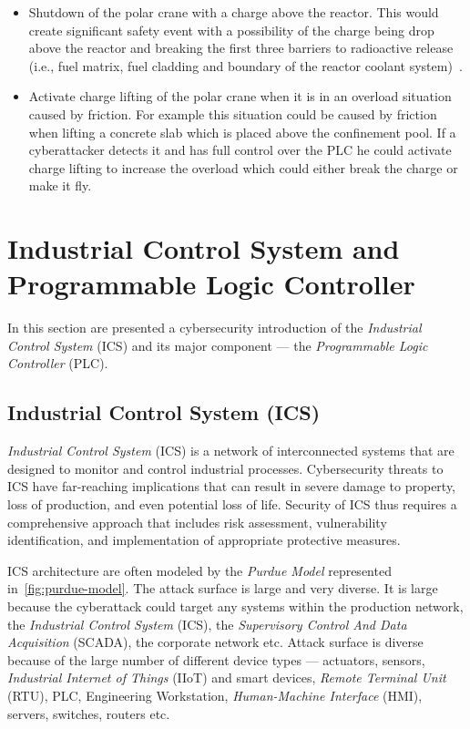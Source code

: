 \begin{itemize}
\item Shutdown of the polar crane with a charge above the reactor. This would create significant safety event with a possibility of the charge being drop above the reactor and breaking the first three barriers to radioactive release (i.e., fuel matrix, fuel cladding and boundary of the reactor coolant system)~\cite{international1996iaea}.
\item Activate charge lifting of the polar crane when it is in an overload situation caused by friction. For example this situation could be caused by friction when lifting a concrete slab which is placed above the confinement pool. If a cyberattacker detects it and  has full control over the PLC he could activate charge lifting to increase the overload which could either break the charge or make it fly.
\end{itemize}

\section{Industrial Control System and Programmable Logic Controller}

In this section are presented a cybersecurity introduction of the \emph{Industrial Control System} (ICS) and its major component — the \emph{Programmable Logic Controller} (PLC). 

\subsection{Industrial Control System (ICS)}

\emph{Industrial Control System} (ICS) is a network of interconnected systems that are designed to monitor and control industrial processes. Cybersecurity threats to ICS have far-reaching implications that can result in severe damage to property, loss of production, and even potential loss of life. Security of ICS thus requires a comprehensive approach that includes risk assessment, vulnerability identification, and implementation of appropriate protective measures.

ICS architecture are often modeled by the \emph{Purdue Model} represented in~\autoref{fig:purdue-model}. The attack surface is large and very diverse. It is large because the cyberattack could target any systems within the production network, the \emph{Industrial Control System} (ICS), the \emph{Supervisory Control And Data Acquisition} (SCADA), the corporate network etc. Attack surface is diverse because of the large number of different device types — actuators, sensors, \emph{Industrial Internet of Things} (IIoT) and smart devices, \emph{Remote Terminal Unit} (RTU), PLC, Engineering Workstation, \emph{Human-Machine Interface} (HMI), servers, switches, routers etc.


